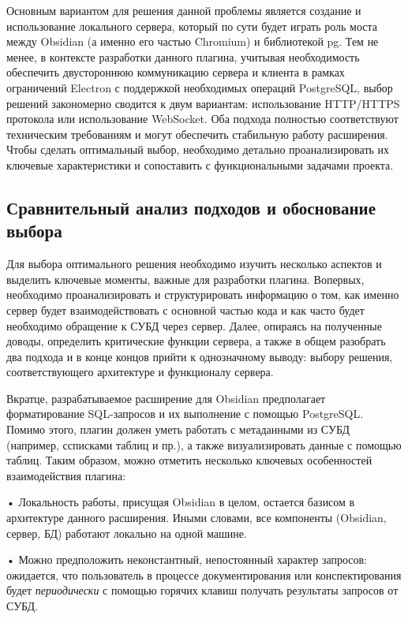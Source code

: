 \documentclass[14pt]{extarticle}
\begin{document}
	Основным вариантом для решения данной проблемы является создание и использование локального сервера, который по сути будет играть роль моста между Obsidian (а именно его частью Chromium) и библиотекой pg. Тем не менее, в контексте разработки данного плагина, учитывая необходимость обеспечить двустороннюю коммуникацию сервера и клиента в рамках ограничений Electron с поддержкой необходимых операций PostgreSQL, выбор решений закономерно сводится к двум вариантам: использование HTTP/HTTPS протокола или использование WebSocket. Оба подхода полностью соответствуют техническим требованиям и могут обеспечить стабильную работу расширения. Чтобы сделать оптимальный выбор, необходимо детально проанализировать их ключевые характеристики и сопоставить с функциональными задачами проекта.
	
	
	\newpage
	\subsection{Сравнительный анализ подходов и обоснование выбора}
	
	Для выбора оптимального решения необходимо изучить несколько аспектов и выделить ключевые моменты, важные для разработки плагина. Вопервых, необходимо проанализировать и структурировать информацию о том, как именно сервер будет взаимодействовать с основной частью кода и как часто будет необходимо обращение к СУБД через сервер. Далее, опираясь на полученные доводы, определить критические функции сервера, а также в общем разобрать два подхода и в конце концов прийти к однозначному выводу: выбору решения, соответствующего архитектуре и функционалу сервера.
	\vspace{1em}
	
	Вкратце, разрабатываемое расширение для Obsidian предполагает форматирование SQL-запросов и их выполнение с помощью PostgreSQL. Помимо этого, плагин должен уметь работать с метаданными из СУБД (например, ссписками таблиц и пр.), а также визуализировать данные с помощью таблиц. Таким образом, можно отметить несколько ключевых особенностей взаимодействия плагина:
	
	• Локальность работы, присущая Obsidian в целом, остается базисом в архитектуре данного расширения. Иными словами, все компоненты (Obsidian, сервер, БД) работают локально на одной машине.
	
	• Можно предположить неконстантный, непостоянный характер запросов: ожидается, что пользователь в процессе документирования или конспектирования будет \textit{периодически} с помощью горячих клавиш получать результаты запросов от СУБД.
	
\end{document}
